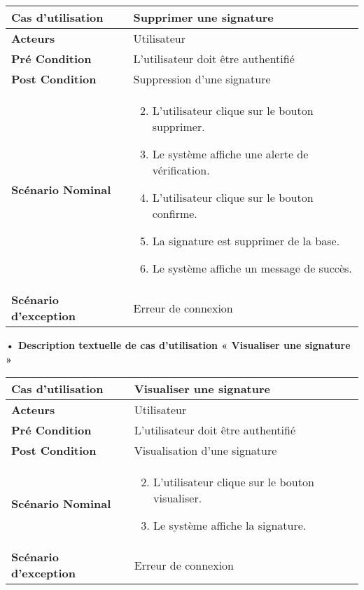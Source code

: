 \begin{longtable}{|p{5cm}|p{10cm}|}
\hline
\textbf{Cas d'utilisation}&Supprimer une signature\\
\hline
\textbf{Acteurs}&Utilisateur \\
\hline
\textbf{Pré Condition}&L'utilisateur doit être authentifié\\
\hline
\textbf{Post Condition}&Suppression  d'une signature\\
\hline
\textbf{Scénario Nominal}&
\vspace{-\baselineskip}
\begin{enumerate}
    \setcounter{enumi}{1}
    \item L'utilisateur clique sur le bouton supprimer.
    \item Le système affiche une alerte de vérification.
    \item L'utilisateur clique sur le bouton confirme.
    \item La signature est supprimer de la base.
    \item Le système affiche un message de succès.
\end{enumerate}\\
\hline
\textbf{Scénario d'exception}&Erreur de connexion\\
\hline
\end{longtable}

\textbf{•	Description textuelle de cas d'utilisation « Visualiser une signature »}

\begin{longtable}{|p{5cm}|p{10cm}|}
\hline
\textbf{Cas d'utilisation}&Visualiser une signature\\
\hline
\textbf{Acteurs}&Utilisateur \\
\hline
\textbf{Pré Condition}&L'utilisateur doit être authentifié\\
\hline
\textbf{Post Condition}&Visualisation d'une signature\\
\hline
\textbf{Scénario Nominal}&
\vspace{-\baselineskip}
\begin{enumerate}
    \setcounter{enumi}{1}
    \item L'utilisateur clique sur le bouton visualiser.
    \item Le système affiche la signature.
\end{enumerate}\\
\hline
\textbf{Scénario d'exception}&Erreur de connexion\\
\hline
\end{longtable}

